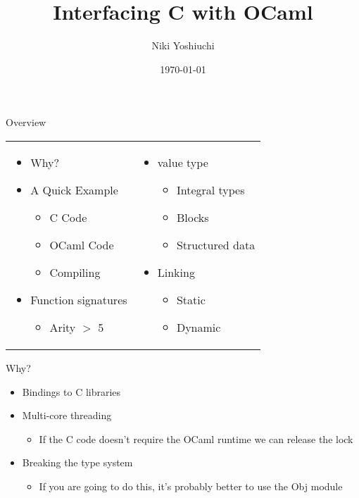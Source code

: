 \documentclass{beamer}
\title{Interfacing C with OCaml}
\author{Niki Yoshiuchi}
\date{\today}
\begin{document}
\begin{frame}[plain]
    \titlepage
\end{frame}

\begin{frame}{Overview}
\begin{tabular}{p{}p{}}
\begin{itemize}
    \item Why?
    \item A Quick Example
    \begin{itemize}
        \item C Code
        \item OCaml Code
        \item Compiling
    \end{itemize}
    \item Function signatures
    \begin{itemize}
        \item Arity $>$ 5
    \end{itemize}
\end{itemize} &

\begin{itemize}
    \item value type
    \begin{itemize}
        \item Integral types
        \item Blocks
        \item Structured data
    \end{itemize}
    \item Linking
    \begin{itemize}
        \item Static
        \item Dynamic
    \end{itemize}
\end{itemize} \\
\end{tabular}
\end{frame}

\begin{frame}{Why?}
\begin{itemize}
    \item Bindings to C libraries
    \item Multi-core threading
    \begin{itemize}
        \item If the C code doesn't require the OCaml runtime we can release the lock
    \end{itemize}
    \item Breaking the type system
    \begin{itemize}
        \item If you are going to do this, it's probably better to use the Obj module
    \end{itemize}
\end{itemize}
\end{frame}
\end{document}
